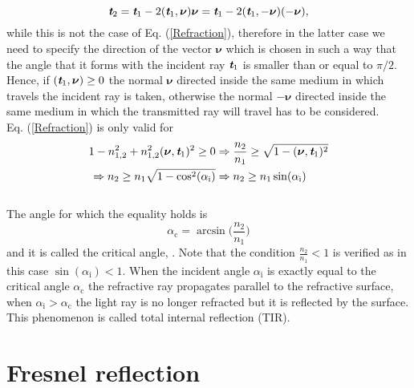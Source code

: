 \begin{equation}
\textit{\textbf{t}}_2 = \textit{\textbf{t}}_1-2(\textit{\textbf{t}}_1,\boldsymbol{\nu})\boldsymbol{\nu}= \textit{\textbf{t}}_1-2(\textit{\textbf{t}}_1,-\boldsymbol{\nu})(-\boldsymbol{\nu}) ,
\end{equation}
while this is not the case of Eq. (\ref{Refraction}), therefore in the latter case we need to specify the direction of the vector $\boldsymbol{\nu}$ which is chosen in such a way that the angle that it forms with the incident ray $\textit{\textbf{t}}_1$ is smaller than or equal to $\pi/2$. Hence, if $(\textit{\textbf{t}}_1, \boldsymbol{\nu})\geq0$ the normal $\boldsymbol{\nu}$ directed inside the same medium in which travels the incident ray is taken, otherwise the normal $-\boldsymbol{\nu}$ directed inside the same medium in which the transmitted ray will travel has to be considered. \\ \indent
Eq. (\ref{Refraction}) is only valid for 
\begin{equation}\label{tir}\begin{split}
1-n_{1,2}^2+n_{1,2}^2(\boldsymbol{\nu},\textit{\textbf{t}}_1)^2\geq 0 & \Rightarrow \frac{n_2}{n_1}\geq \sqrt{1-(\boldsymbol{\nu},\textit{\textbf{t}}_1)^2}\\
\Rightarrow n_2\geq n_1\sqrt{1-\cos^2(\alpha_\textrm{i})} & \Rightarrow  n_2\geq n_1 \sin(\alpha_\textrm{i})
\end{split}
\end{equation}
\\ \indent
 The angle for which the equality holds is
\begin{equation}\label{critical}
\alpha_{\textrm{c}} = \arcsin\Big(\frac{n_2}{n_1}\Big)
\end{equation} and it is called the critical angle, \cite{chaves2015introduction}.
Note that the condition $\frac{n_2}{n_1}<1$ is verified as in this case $\sin(\alpha_\textrm{i})<1$.
When the incident angle $\alpha_{\textrm{i}}$ is exactly equal to the critical angle $\alpha_{\textrm{c}}$ the refractive ray propagates parallel to the refractive surface, 
when $\alpha_{\textrm{i}}>\alpha_{\textrm{c}}$ the light ray is no longer refracted but it is reflected by the surface. This phenomenon is called total internal reflection (TIR). 









































\section{Fresnel reflection}
